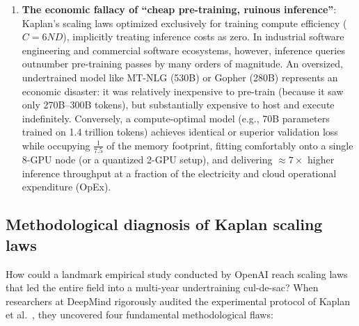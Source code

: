 \documentclass[../../main.tex]{subfiles}
\begin{document}
\begin{enumerate}
    \item \textbf{The economic fallacy of ``cheap pre-training, ruinous inference''}:
    Kaplan's scaling laws optimized exclusively for training compute efficiency ($C = 6ND$), implicitly treating inference costs as zero. In industrial software engineering and commercial software ecosystems, however, inference queries outnumber pre-training passes by many orders of magnitude.
    An oversized, undertrained model like MT-NLG (530B) or Gopher (280B) represents an economic disaster: it was relatively inexpensive to pre-train (because it saw only 270B--300B tokens), but substantially expensive to host and execute indefinitely.
    Conversely, a compute-optimal model (e.g., 70B parameters trained on 1.4 trillion tokens) achieves identical or superior validation loss while occupying $\frac{1}{7.5}$ of the memory footprint, fitting comfortably onto a single 8-GPU node (or a quantized 2-GPU setup), and delivering $\approx 7\times$ higher inference throughput at a fraction of the electricity and cloud operational expenditure (OpEx).
\end{enumerate}

\subsection{Methodological diagnosis of Kaplan scaling laws}
\label{subsec:kaplan_methodology_diagnosis}

How could a landmark empirical study conducted by OpenAI reach scaling laws that led the entire field into a multi-year undertraining cul-de-sac? When researchers at DeepMind rigorously audited the experimental protocol of Kaplan et al.~\cite{kaplan2020}, they uncovered four fundamental methodological flaws:
\end{document}
